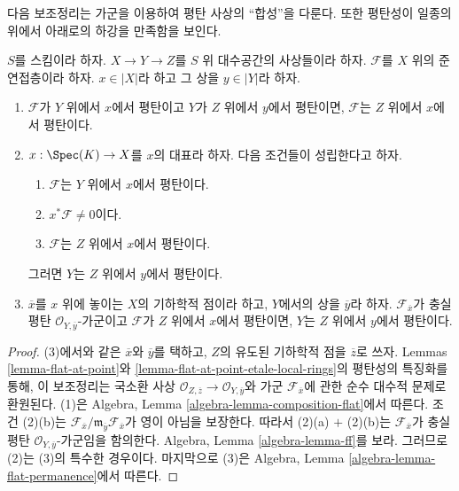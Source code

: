 \noindent
다음 보조정리는 가군을 이용하여 평탄 사상의 ``합성''을 다룬다.
또한 평탄성이 일종의 위에서 아래로의 하강을 만족함을 보인다.

\begin{lemma}
\label{lemma-composition-module-flat}
$S$를 스킴이라 하자. $X \to Y \to Z$를 $S$ 위 대수공간의
사상들이라 하자. $\mathcal{F}$를 $X$ 위의 준연접층이라 하자.
$x \in |X|$라 하고 그 상을 $y \in |Y|$라 하자.
\begin{enumerate}
\item $\mathcal{F}$가 $Y$ 위에서 $x$에서 평탄이고
$Y$가 $Z$ 위에서 $y$에서 평탄이면, $\mathcal{F}$는
$Z$ 위에서 $x$에서 평탄이다.
\item $x : \Spec(K) \to X$를 $x$의 대표라 하자. 다음 조건들이
성립한다고 하자.
\begin{enumerate}
\item $\mathcal{F}$는 $Y$ 위에서 $x$에서 평탄이다.
\item $x^*\mathcal{F} \not = 0$이다.
\item $\mathcal{F}$는 $Z$ 위에서 $x$에서 평탄이다.
\end{enumerate}
그러면 $Y$는 $Z$ 위에서 $y$에서 평탄이다.
\item $\overline{x}$를 $x$ 위에 놓이는 $X$의 기하학적 점이라 하고,
$Y$에서의 상을 $\overline{y}$라 하자. $\mathcal{F}_{\overline{x}}$가
충실 평탄 $\mathcal{O}_{Y, \overline{y}}$-가군이고
$\mathcal{F}$가 $Z$ 위에서 $x$에서 평탄이면,
$Y$는 $Z$ 위에서 $y$에서 평탄이다.
\end{enumerate}
\end{lemma}

\begin{proof}
(3)에서와 같은 $\overline{x}$와 $\overline{y}$를 택하고,
$Z$의 유도된 기하학적 점을 $\overline{z}$로 쓰자.
Lemmas \ref{lemma-flat-at-point}와
\ref{lemma-flat-at-point-etale-local-rings}의 평탄성의 특징화를 통해,
이 보조정리는 국소환 사상
$\mathcal{O}_{Z, \overline{z}} \to \mathcal{O}_{Y, \overline{y}}$와
가군 $\mathcal{F}_{\overline{x}}$에 관한 순수 대수적 문제로 환원된다.
(1)은 Algebra, Lemma \ref{algebra-lemma-composition-flat}에서 따른다.
조건 (2)(b)는
$\mathcal{F}_{\overline{x}}/
\mathfrak m_{\overline{y}} \mathcal{F}_{\overline{x}}$가
영이 아님을 보장한다. 따라서 (2)(a) $+$ (2)(b)는
$\mathcal{F}_{\overline{x}}$가 충실 평탄
$\mathcal{O}_{Y, \overline{y}}$-가군임을 함의한다. Algebra, Lemma
\ref{algebra-lemma-ff}를 보라. 그러므로 (2)는 (3)의 특수한 경우이다.
마지막으로 (3)은 Algebra, Lemma
\ref{algebra-lemma-flat-permanence}에서 따른다.
\end{proof}

